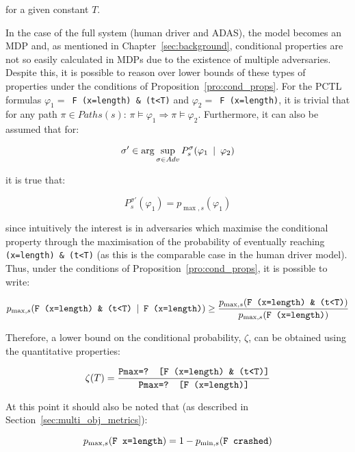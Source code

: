 for a given constant $T$.

In the case of the full system (human driver and ADAS), the model becomes an MDP and, as mentioned in Chapter~\ref{sec:background}, conditional properties are not so easily calculated in MDPs due to the existence of multiple adversaries. Despite this, it is possible to reason over lower bounds of these types of properties under the conditions of Proposition~\ref{pro:cond_props}. For the PCTL formulas $\varphi_1 = $\texttt{ F (x=length) \& (t<T)} and $\varphi_2 = $\texttt{ F (x=length)}, it is trivial that for any path $\pi \in Paths(s)$: $\pi \models \varphi_1 \Rightarrow \pi \models \varphi_2$. Furthermore, it can also be assumed that for:

\begin{equation}
	\sigma' \in \arg\sup_{\sigma \in Adv} P^{\sigma}_s (\varphi_1 \:\mid\: \varphi_2)
\end{equation}

it is true that:

\begin{equation}
	P^{\sigma'}_s (\varphi_1) = p_{\max, s} (\varphi_1)
\end{equation}

since intuitively the interest is in adversaries which maximise the conditional property through the maximisation of the probability of eventually reaching \texttt{(x=length) \& (t<T)} (as this is the comparable case in the human driver model). Thus, under the conditions of Proposition~\ref{pro:cond_props}, it is possible to write:

\begin{equation}
	p_{\max, s} (\text{\texttt{F (x=length) \& (t<T)}} \:\mid\: \text{\texttt{F (x=length)}}) \geq \frac{p_{\max, s} (\text{\texttt{F (x=length) \& (t<T)}})}{p_{\max, s} (\text{\texttt{F (x=length)}})}
\end{equation}

Therefore, a lower bound on the conditional probability, $\zeta$, can be obtained using the quantitative properties:

\begin{equation}
	\zeta(T) = \frac{\text{\texttt{Pmax=? [F (x=length) \& (t<T)]}}}{\text{\texttt{Pmax=? [F (x=length)]}}}
\end{equation}

At this point it should also be noted that (as described in Section~\ref{sec:multi_obj_metrics}):

\begin{equation}
	p_{\max,s} (\text{\texttt{F x=length}}) = 1 - p_{\min,s} (\text{\texttt{F crashed}})
\end{equation}

